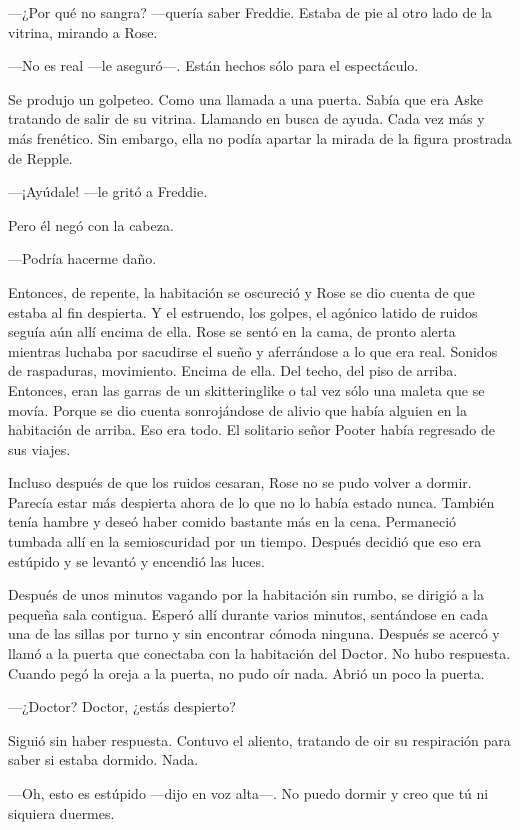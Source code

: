 {---¿Por qué no sangra? ---quería saber Freddie. Estaba de pie al otro
lado de la vitrina, mirando a Rose.}

{---No es real ---le aseguró---. Están hechos sólo para el espectáculo.}

{Se produjo un golpeteo. Como una llamada a una puerta. Sabía que era
	Aske tratando de salir de su vitrina. Llamando en busca de ayuda. Cada
	vez más y más frenético. Sin embargo, ella no podía apartar la mirada de
la figura prostrada de Repple.}

{---¡Ayúdale! ---le gritó a Freddie.}

{Pero él negó con la cabeza.}

{---Podría hacerme daño.}

{Entonces, de repente, la habitación se oscureció y Rose se dio cuenta
	de que estaba al fin despierta. Y el estruendo, los golpes, el agónico
	latido de ruidos seguía aún allí encima de ella. Rose se sentó en la
	cama, de pronto alerta mientras luchaba por sacudirse el sueño y
	aferrándose a lo que era real. Sonidos de raspaduras, movimiento. Encima
	de ella. Del techo, del piso de arriba. Entonces, eran las garras de un
	skitteringlike o tal vez sólo una maleta que se movía. Porque se dio
	cuenta sonrojándose de alivio que había alguien en la habitación de
	arriba. Eso era todo. El solitario señor Pooter había regresado de sus
viajes.}

{Incluso después de que los ruidos cesaran, Rose no se pudo volver a
	dormir. Parecía estar más despierta ahora de lo que no lo había estado
	nunca. También tenía hambre y deseó haber comido bastante más en la
	cena. Permaneció tumbada allí en la semioscuridad por un tiempo. Después
decidió que eso era estúpido y se levantó y encendió las luces.}

{Después de unos minutos vagando por la habitación sin rumbo, se dirigió
	a la pequeña sala contigua. Esperó allí durante varios minutos,
	sentándose en cada una de las sillas por turno y sin encontrar cómoda
	ninguna. Después se acercó y llamó a la puerta que conectaba con la
	habitación del Doctor. No hubo respuesta. Cuando pegó la oreja a la
puerta, no pudo oír nada. Abrió un poco la puerta.}

{---¿Doctor? Doctor, ¿estás despierto?}

{Siguió sin haber respuesta. Contuvo el aliento, tratando de oir su
respiración para saber si estaba dormido. Nada.}

{---Oh, esto es estúpido ---dijo en voz alta---. No puedo dormir y creo
que tú ni siquiera duermes.}

